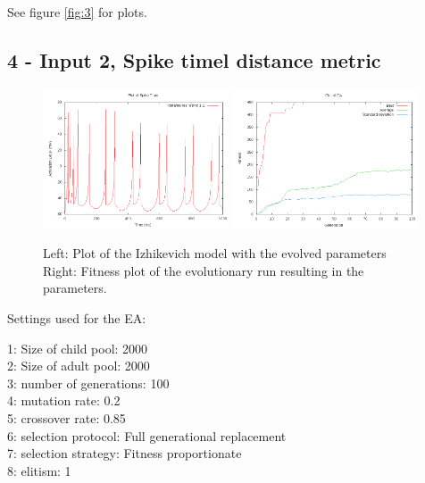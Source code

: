 \documentclass[11pt]{article}
\begin{document}
See figure \ref{fig:3} for plots.

\subsection*{4 - Input 2, Spike timel distance metric}

\begin{figure}
\begin{center}
\mbox{\includegraphics[width=0.49\textwidth]{images/4-res.png}}
\mbox{\includegraphics[width=0.49\textwidth]{images/4-fit.png}}
\end{center}
\caption{Left: Plot of the Izhikevich model with the evolved parameters\\
Right: Fitness plot of the evolutionary run resulting in the parameters.}
\label{fig:4}
\end{figure}

Settings used for the EA:

1: Size of child pool: 2000\\
2: Size of adult pool: 2000\\
3: number of generations: 100\\
4: mutation rate: 0.2\\
5: crossover rate: 0.85\\
6: selection protocol: Full generational replacement\\
7: selection strategy: Fitness proportionate\\
8: elitism: 1\\
\end{document}
